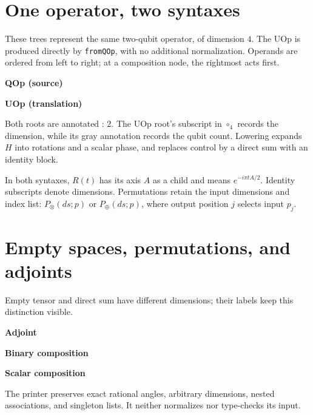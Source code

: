 \documentclass[11pt,a4paper,landscape]{article}
\begin{document}
\section*{One operator, two syntaxes}
These trees represent the same two-qubit operator, of dimension $4$.
The UOp is produced directly by \texttt{fromQOp}, with no additional normalization.
Operands are ordered from left to right; at a composition node, the rightmost acts first.
\begin{center}
\begin{minipage}[t]{.24\textwidth}\centering
\textbf{QOp (source)}\par\medskip
\end{minipage}\hfill
\begin{minipage}[t]{.73\textwidth}\centering
\textbf{UOp (translation)}\par\medskip
\end{minipage}
\end{center}
Both roots are annotated $:\,2$. The UOp root's subscript in $\circ_4$ records
the dimension, while its gray annotation records the qubit count.
Lowering expands $H$ into rotations and a scalar phase, and replaces control by
a direct sum with an identity block.

In both syntaxes, $R(t)$ has its axis $A$ as a child and means $e^{-i\pi tA/2}$.
Identity subscripts denote dimensions. Permutations retain the input dimensions
and index list: $P_\otimes(ds;p)$ or $P_\oplus(ds;p)$, where output position $j$
selects input $p_j$.

\newpage
\section*{Empty spaces, permutations, and adjoints}
Empty tensor and direct sum have different dimensions; their labels keep this distinction visible.
\begin{center}
\qquad\qquad
\par\bigskip\qquad
\par\bigskip
\begin{minipage}[t]{.28\textwidth}\centering
\textbf{Adjoint}\par\medskip

\end{minipage}
\begin{minipage}[t]{.38\textwidth}\centering
\textbf{Binary composition}\par\medskip

\end{minipage}
\begin{minipage}[t]{.28\textwidth}\centering
\textbf{Scalar composition}\par\medskip

\end{minipage}
\end{center}
The printer preserves exact rational angles, arbitrary dimensions, nested
associations, and singleton lists. It neither normalizes nor type-checks its input.
\end{document}
